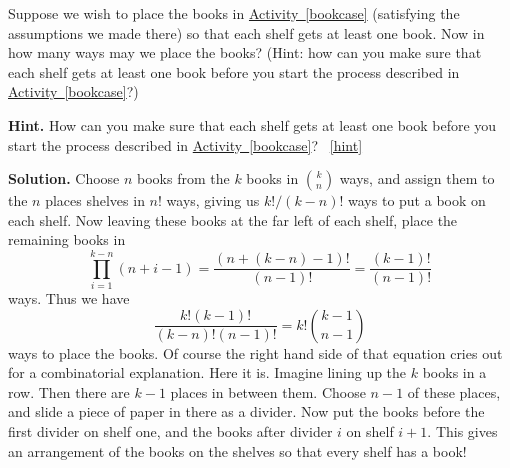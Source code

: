 \documentclass{book}
\begin{document}
\setcounter{project}{126}
\addtocounter{project}{-1}
\begin{activity}[]\label{bookcaseeveryshelf}
\hypertarget{p-883}{}%
Suppose we wish to place the books in \hyperref[bookcase]{Activity~\ref{bookcase}} (satisfying the assumptions we made there) so that each shelf gets at least one book. Now in how many ways may we place the books? (Hint: how can you make sure that each shelf gets at least one book before you start the process described in \hyperref[bookcase]{Activity~\ref{bookcase}}?)%
\par\smallskip%
\noindent\textbf{Hint.}\hypertarget{hint-84}{}\quad%
\hypertarget{p-884}{}%
How can you make sure that each shelf gets at least one book before you start the process described in \hyperref[bookcase]{Activity~\ref{bookcase}}?%
~\hfill{\tiny\hyperlink{a-126}{[hint]}\hypertarget{q-126}{}}\par\smallskip%
\noindent\textbf{Solution.}\hypertarget{solution-84}{}\quad%
\hypertarget{p-885}{}%
Choose \(n\) books from the \(k\) books in \(\binom{k}{n}\) ways, and assign them to the \(n\) places shelves in \(n!\) ways, giving us \(k!/(k-n)!\) ways to put a book on each shelf. Now leaving these books at the far left of each shelf, place the remaining books in%
\begin{equation*}
\prod_{i=1}^{k-n}
(n+i-1)=\frac{(n+(k-n)-1)!}{(n-1)!}=\frac{(k-1)!}{(n-1)!}
\end{equation*}
ways. Thus we have%
\begin{equation*}
\frac{k!(k-1)!}{(k-n)!(n-1)!}=k!\binom{k-1}{n-1}
\end{equation*}
ways to place the books. Of course the right hand side of that equation cries out for a combinatorial explanation. Here it is. Imagine lining up the \(k\) books in a row. Then there are \(k-1\) places in between them. Choose \(n-1\) of these places, and slide a piece of paper in there as a divider. Now put the books before the first divider on shelf one, and the books after divider \(i\) on shelf \(i+1\). This gives an arrangement of the books on the shelves so that every shelf has a book!%
\end{activity}
\end{document}
